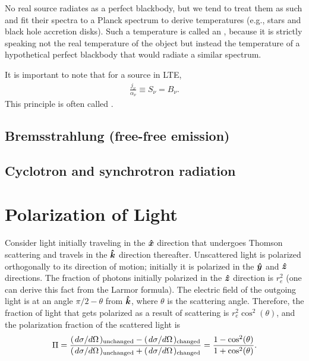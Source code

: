 No real source radiates as a perfect blackbody, but we tend to treat them as such and fit their spectra to a Planck spectrum to derive temperatures (e.g., stars and black hole accretion disks). Such a temperature is called an , because it is strictly speaking not the real temperature of the object but instead the temperature of a hypothetical perfect blackbody that would radiate a similar spectrum.

It is important to note that for a source in LTE,
\begin{align}
    \frac{j_\nu}{\alpha_\nu} \equiv S_\nu = B_\nu.
\end{align}
This principle is often called .

\subsection{Bremsstrahlung (free-free emission)}


\subsection{Cyclotron and synchrotron radiation}


\section{Polarization of Light}
Consider light initially traveling in the $\vu*{x}$ direction that undergoes Thomson scattering and travels in the $\vu*{k}$ direction thereafter. Unscattered light is polarized orthogonally to its direction of motion; initially it is polarized in the $\vu*{y}$ and $\vu*{z}$ directions. The fraction of photons initially polarized in the $\vu*{z}$ direction is $r_e^2$ (one can derive this fact from the Larmor formula). The electric field of the outgoing light is at an angle $\pi/2 - \theta$ from $\vu*{k}$, where $\theta$ is the scattering angle. Therefore, the fraction of light that gets polarized as a result of scattering is $r_e^2 \cos^2(\theta)$, and the polarization fraction of the scattered light is
\begin{align}
    \Pi = \frac{(\dv*{\sigma}{\Omega})_\text{unchanged} - (\dv*{\sigma}{\Omega})_\text{changed}}{(\dv*{\sigma}{\Omega})_\text{unchanged} + (\dv*{\sigma}{\Omega})_\text{changed}} = \frac{1 - \cos^2(\theta)}{1 + \cos^2(\theta)}.
\end{align}

